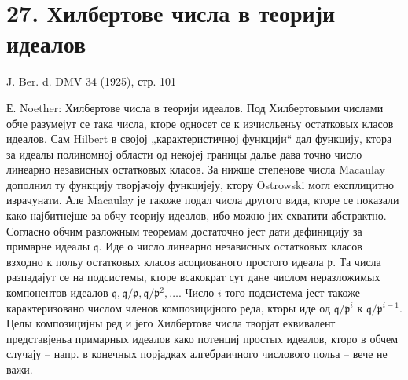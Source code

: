 ﻿\documentclass[11pt]{article}
\begin{document}
\section*{27. Хилбертове числа в теорији идеалов}

\begin{center}
J. Ber. d. DMV 34 (1925), стр. 101
\end{center}

Е. Noether: Хилбертове числа в теорији идеалов. Под Хилбертовыми числами обче разумејут се така числа, кторе односет се к изчисльеньу остатковых класов идеалов. Сам Hilbert в својој „карактеристичној функцији“ дал функцију, ктора за идеалы полиномној области од некојеј границы далье дава точно число линеарно независных остатковых класов. За нижше степенове числа Macaulay дополнил ту функцију творјачоју функцијеју, ктору Ostrowski могл експлицитно израчунати. Але Macaulay је такоже подал числа другого вида, кторе се показали како најбитнејше за обчу теорију идеалов, ибо можно јих схватити абстрактно. Согласно обчим разложным теоремам достаточно јест дати дефиницију за примарне идеалы $\mathfrak q$. Иде о число линеарно независных остатковых класов взходно к польу остатковых класов асоциованого простого идеала $\mathfrak p$. Та числа разпадајут се на подсистемы, кторе всакократ сут дане числом неразложимых компонентов идеалов $\mathfrak q,\mathfrak q/\mathfrak p,\mathfrak q/\mathfrak p^2,\ldots$. Число $i$-того подсистема јест такоже карактеризовано числом членов композицијного реда, кторы иде од $\mathfrak q/\mathfrak p^i$ к $\mathfrak q/\mathfrak p^{i-1}$. Целы композицијны ред и јего Хилбертове числа творјат еквивалент представјеньа примарных идеалов како потенциј простых идеалов, кторо в обчем случају -- напр. в конечных порјадках алгебраичного числового польа -- вече не важи.
\end{document}
